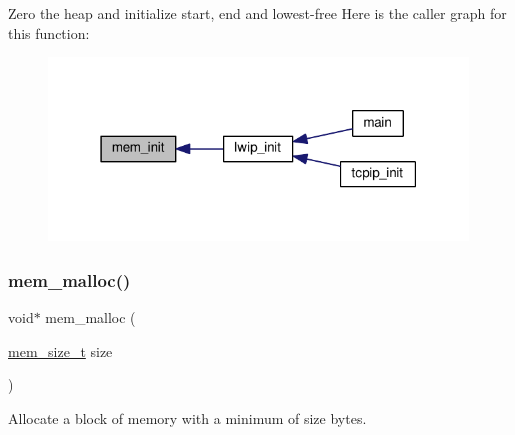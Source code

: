Zero the heap and initialize start, end and lowest-\/free Here is the caller graph for this function\+:
\nopagebreak
\begin{figure}[H]
\begin{center}
\leavevmode
\includegraphics[width=316pt]{openmote-cc2538_2lwip_2src_2include_2lwip_2mem_8h_a44a136e3b70c36abb6f8dc060c778113_icgraph}
\end{center}
\end{figure}
\mbox{\label{openmote-cc2538_2lwip_2src_2include_2lwip_2mem_8h_a932aa40d85b14cb7331625e012d12335}} 
\subsubsection{\texorpdfstring{mem\+\_\+malloc()}{mem\_malloc()}}
{\footnotesize\ttfamily void$\ast$ mem\+\_\+malloc (\begin{DoxyParamCaption}\item[{\hyperlink{native_2lwip_2src_2include_2lwip_2mem_8h_a49bff6e5dd4cb95fe6dc0670962bbf54}{mem\+\_\+size\+\_\+t}}]{size }\end{DoxyParamCaption})}

Allocate a block of memory with a minimum of \textquotesingle{}size\textquotesingle{} bytes.


